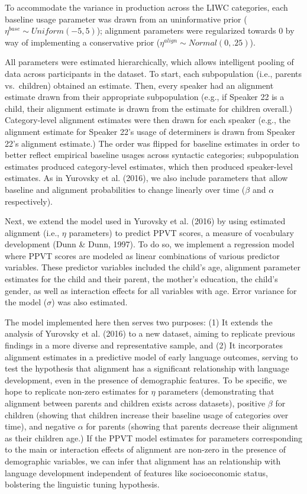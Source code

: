 \documentclass[10pt, letterpaper]{article}
\begin{document}
To accommodate the variance in production across the LIWC categories,
each baseline usage parameter was drawn from an uninformative prior
(\(\eta^{base} \sim Uniform(-5,5)\)); alignment parameters were
regularized towards 0 by way of implementing a conservative prior
(\(\eta^{align} \sim Normal(0,.25)\)).

All parameters were estimated hierarchically, which allows intelligent
pooling of data across participants in the dataset. To start, each
subpopulation (i.e., parents vs.~children) obtained an estimate. Then,
every speaker had an alignment estimate drawn from their appropriate
subpopulation (e.g., if Speaker 22 is a child, their alignment estimate
is drawn from the estimate for children overall.) Category-level
alignment estimates were then drawn for each speaker (e.g., the
alignment estimate for Speaker 22's usage of determiners is drawn from
Speaker 22's alignment estimate.) The order was flipped for baseline
estimates in order to better reflect empirical baseline usages across
syntactic categories; subpopulation estimates produced category-level
estimates, which then produced speaker-level estimates. As in Yurovsky
et al. (2016), we also include parameters that allow baseline and
alignment probabilities to change linearly over time (\(\beta\) and
\(\alpha\) respectively).

Next, we extend the model used in Yurovsky et al. (2016) by using
estimated alignment (i.e., \(\eta\) parameters) to predict PPVT scores,
a measure of vocabulary development (Dunn \& Dunn, 1997). To do so, we
implement a regression model where PPVT scores are modeled as linear
combinations of various predictor variables. These predictor variables
included the child's age, alignment parameter estimates for the child
and their parent, the mother's education, the child's gender, as well as
interaction effects for all variables with age. Error variance for the
model (\(\sigma\)) was also estimated.

The model implemented here then serves two purposes: (1) It extends the
analysis of Yurovsky et al. (2016) to a new dataset, aiming to replicate
previous findings in a more diverse and representative sample, and (2)
It incorporates alignment estimates in a predictive model of early
language outcomes, serving to test the hypothesis that alignment has a
significant relationship with language development, even in the presence
of demographic features. To be specific, we hope to replicate non-zero
estimates for \(\eta\) parameters (demonstrating that alignment between
parents and children exists across datasets), positive \(\beta\) for
children (showing that children increase their baseline usage of
categories over time), and negative \(\alpha\) for parents (showing that
parents decrease their alignment as their children age.) If the PPVT
model estimates for parameters corresponding to the main or interaction
effects of alignment are non-zero in the presence of demographic
variables, we can infer that alignment has an relationship with language
development independent of features like socioeconomic status,
bolstering the linguistic tuning hypothesis.
\end{document}

